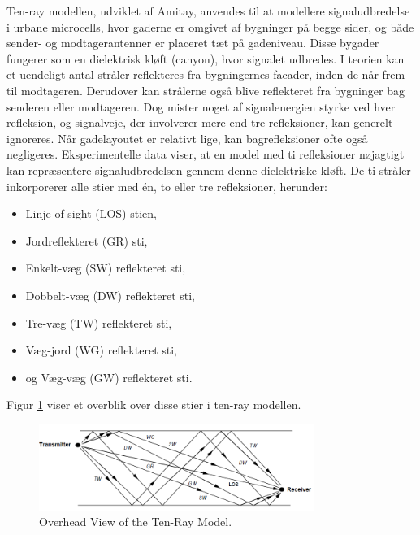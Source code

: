 \documentclass[a4paper,12pt]{book}
\begin{document}
	\noindent Ten-ray modellen, udviklet af Amitay, anvendes til at modellere signaludbredelse i urbane microcells, hvor gaderne er omgivet af bygninger på begge sider, og både sender- og modtagerantenner er placeret tæt på gadeniveau. Disse bygader fungerer som en dielektrisk kløft (canyon), hvor signalet udbredes. 
	\newline\newline
	\noindent I teorien kan et uendeligt antal stråler reflekteres fra bygningernes facader, inden de når frem til modtageren. Derudover kan strålerne også blive reflekteret fra bygninger bag senderen eller modtageren. Dog mister noget af signalenergien styrke ved hver refleksion, og signalveje, der involverer mere end tre refleksioner, kan generelt ignoreres. Når gadelayoutet er relativt lige, kan bagrefleksioner ofte også negligeres.
	\newline\newline
	\noindent Eksperimentelle data viser, at en model med ti refleksioner nøjagtigt kan repræsentere signaludbredelsen gennem denne dielektriske kløft. De ti stråler inkorporerer alle stier med én, to eller tre refleksioner, herunder:
	
	\begin{itemize}
		\item Linje-of-sight (LOS) stien,
		\item Jordreflekteret (GR) sti,
		\item Enkelt-væg (SW) reflekteret sti,
		\item Dobbelt-væg (DW) reflekteret sti,
		\item Tre-væg (TW) reflekteret sti,
		\item Væg-jord (WG) reflekteret sti,
		\item og Væg-væg (GW) reflekteret sti.
	\end{itemize}
	
	\noindent Figur \ref{fig:ten_ray_model} viser et overblik over disse stier i ten-ray modellen.
	
	\begin{figure}[h]
		\centering
		\includegraphics[width=0.8\textwidth]{fig/fig6.png}
		\caption{Overhead View of the Ten-Ray Model.}
		\label{fig:ten_ray_model}
	\end{figure}
	
\end{document}
